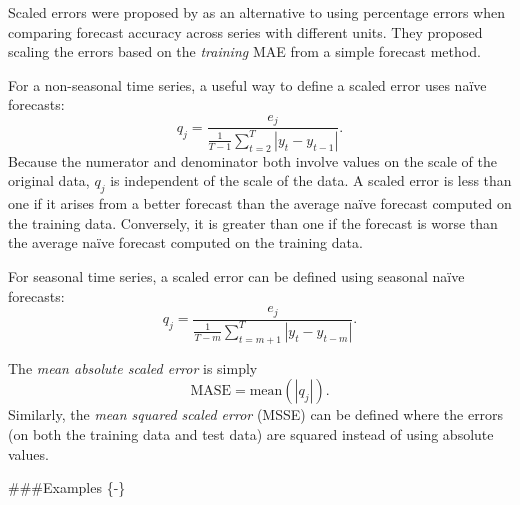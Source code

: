 \documentclass[]{book}
\begin{document}
Scaled errors were proposed by \citet{HK06} as an alternative to using percentage errors when comparing forecast accuracy across series with different units. They proposed scaling the errors based on the \emph{training} MAE from a simple forecast method.

For a non-seasonal time series, a useful way to define a scaled error uses naïve forecasts:
\[
  q_{j} = \frac{\displaystyle e_{j}}
    {\displaystyle\frac{1}{T-1}\sum_{t=2}^T |y_{t}-y_{t-1}|}.
\]
Because the numerator and denominator both involve values on the scale of the original data, \(q_{j}\) is independent of the scale of the data. A scaled error is less than one if it arises from a better forecast than the average naïve forecast computed on the training data. Conversely, it is greater than one if the forecast is worse than the average naïve forecast computed on the training data.

For seasonal time series, a scaled error can be defined using seasonal naïve forecasts:
\[
  q_{j} = \frac{\displaystyle e_{j}}
    {\displaystyle\frac{1}{T-m}\sum_{t=m+1}^T |y_{t}-y_{t-m}|}.
\]

The \emph{mean absolute scaled error} is simply
\[
  \text{MASE} = \text{mean}(|q_{j}|).
\]
Similarly, the \emph{mean squared scaled error} (MSSE) can be defined where the errors (on both the training data and test data) are squared instead of using absolute values.

\#\#\#Examples \{-\}
\end{document}
